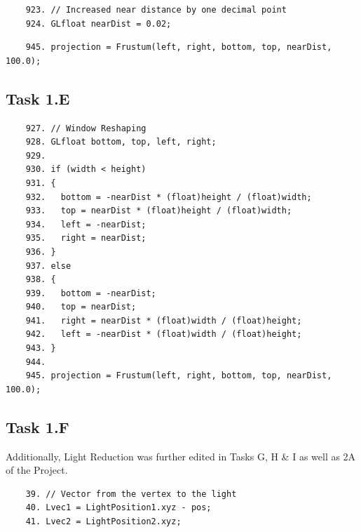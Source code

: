 \documentclass{article}
\begin{document}
\begin{commandline}
	\begin{verbatim}
	923. // Increased near distance by one decimal point
	924. GLfloat nearDist = 0.02;
	\end{verbatim}
\end{commandline}

\begin{commandline}
	\begin{verbatim}
	945. projection = Frustum(left, right, bottom, top, nearDist, 100.0);
	\end{verbatim}
\end{commandline}

\newpage

\subsection{Task 1.E}\label{sec:1E}

\begin{commandline}
	\begin{verbatim}
	927. // Window Reshaping
	928. GLfloat bottom, top, left, right;
	929.
	930. if (width < height)
	931. {
	932.   bottom = -nearDist * (float)height / (float)width;
	933.   top = nearDist * (float)height / (float)width;
	934.   left = -nearDist;
	935.   right = nearDist;
	936. }
	937. else
	938. {
	939.   bottom = -nearDist;
	940.   top = nearDist;
	941.   right = nearDist * (float)width / (float)height;
	942.   left = -nearDist * (float)width / (float)height;
	943. }
	944. 
	945. projection = Frustum(left, right, bottom, top, nearDist, 100.0);
	\end{verbatim}
\end{commandline}

\subsection{Task 1.F}\label{sec:1F}

\begin{info} %
	Additionally, Light Reduction was further edited in Tasks G, H \& I  as well as 2A of the Project.
\end{info}

\begin{commandlineV}
	\begin{verbatim}
	39. // Vector from the vertex to the light
	40. Lvec1 = LightPosition1.xyz - pos;
	41. Lvec2 = LightPosition2.xyz;
	\end{verbatim}
\end{commandlineV}
\end{document}
